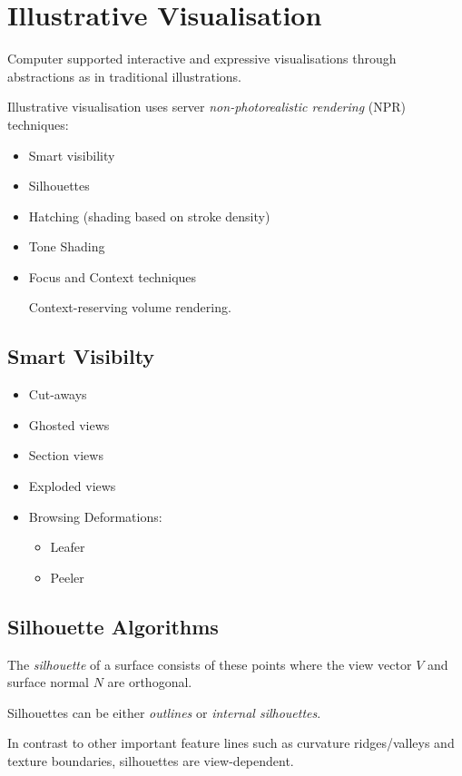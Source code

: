 \section{Illustrative Visualisation}
Computer supported interactive and expressive visualisations through abstractions as in traditional illustrations.

Illustrative visualisation uses server \emph{non-photorealistic rendering} (NPR) techniques:
\begin{itemize}
    \item Smart visibility
    \item Silhouettes
    \item Hatching (shading based on stroke density)
    \item Tone Shading
    \item Focus and Context techniques
    
    Context-reserving volume rendering.
\end{itemize}

\subsection{Smart Visibilty}
\begin{itemize}
\item Cut-aways
\item Ghosted views
\item Section views
\item Exploded views
\item Browsing Deformations:
    \begin{itemize}
        \item Leafer
        \item Peeler
    \end{itemize}
\end{itemize}

\subsection{Silhouette Algorithms}
The \emph{silhouette} of a surface consists of these points where the view vector $V$ and surface normal $N$ are orthogonal.

Silhouettes can be either \emph{outlines} or \emph{internal silhouettes}.


In contrast to other important feature lines such as curvature ridges/valleys and texture boundaries, silhouettes are view-dependent.

